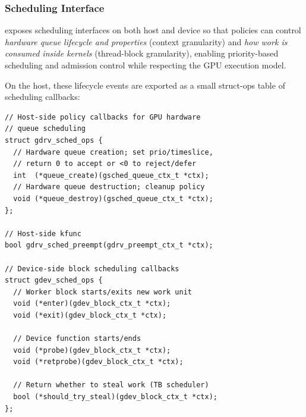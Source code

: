 \subsubsection{Scheduling Interface}
\label{sec:design-sched}

\sys exposes scheduling interfaces on both host and device so that policies can control
\emph{hardware queue lifecycle and properties} (context granularity) and \emph{how work is consumed inside kernels} (thread-block granularity), enabling priority-based scheduling and admission control while respecting the GPU execution model.

On the host, these lifecycle events are exported as a small struct-ops table of
scheduling callbacks:

\begin{verbatim}
// Host-side policy callbacks for GPU hardware
// queue scheduling
struct gdrv_sched_ops {
  // Hardware queue creation; set prio/timeslice,
  // return 0 to accept or <0 to reject/defer
  int  (*queue_create)(gsched_queue_ctx_t *ctx);
  // Hardware queue destruction; cleanup policy
  void (*queue_destroy)(gsched_queue_ctx_t *ctx);
};

// Host-side kfunc
bool gdrv_sched_preempt(gdrv_preempt_ctx_t *ctx);

// Device-side block scheduling callbacks
struct gdev_sched_ops {
  // Worker block starts/exits new work unit
  void (*enter)(gdev_block_ctx_t *ctx);
  void (*exit)(gdev_block_ctx_t *ctx);
  
  // Device function starts/ends
  void (*probe)(gdev_block_ctx_t *ctx);
  void (*retprobe)(gdev_block_ctx_t *ctx);
  
  // Return whether to steal work (TB scheduler)
  bool (*should_try_steal)(gdev_block_ctx_t *ctx);
};
\end{verbatim}

